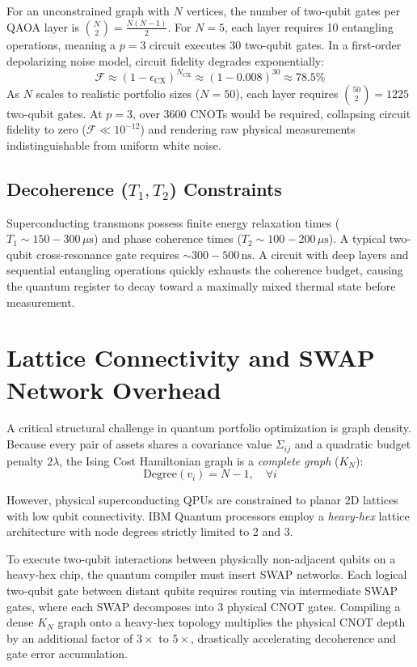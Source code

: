 For an unconstrained graph with $N$ vertices, the number of two-qubit gates per QAOA layer is $\binom{N}{2} = \frac{N(N-1)}{2}$. For $N = 5$, each layer requires 10 entangling operations, meaning a $p=3$ circuit executes 30 two-qubit gates. In a first-order depolarizing noise model, circuit fidelity degrades exponentially:
\begin{equation}
\mathcal{F} \approx (1 - \epsilon_{\text{CX}})^{N_{\text{CX}}} \approx (1 - 0.008)^{30} \approx 78.5\%
\end{equation}
As $N$ scales to realistic portfolio sizes ($N = 50$), each layer requires $\binom{50}{2} = 1225$ two-qubit gates. At $p=3$, over 3600 CNOTs would be required, collapsing circuit fidelity to zero ($\mathcal{F} \ll 10^{-12}$) and rendering raw physical measurements indistinguishable from uniform white noise.

\subsection{Decoherence \texorpdfstring{($T_1, T_2$)}{(T1, T2)} Constraints}
Superconducting transmons possess finite energy relaxation times ($T_1 \sim 150 - 300\,\mu\text{s}$) and phase coherence times ($T_2 \sim 100 - 200\,\mu\text{s}$). A typical two-qubit cross-resonance gate requires $\sim 300 - 500\,\text{ns}$. A circuit with deep layers and sequential entangling operations quickly exhausts the coherence budget, causing the quantum register to decay toward a maximally mixed thermal state before measurement.

\section{Lattice Connectivity and SWAP Network Overhead}
A critical structural challenge in quantum portfolio optimization is graph density. Because every pair of assets shares a covariance value $\Sigma_{ij}$ and a quadratic budget penalty $2\lambda$, the Ising Cost Hamiltonian graph is a \textit{complete graph} ($K_N$):
\begin{equation}
\text{Degree}(v_i) = N - 1, \quad \forall i
\end{equation}

However, physical superconducting QPUs are constrained to planar 2D lattices with low qubit connectivity. IBM Quantum processors employ a \textit{heavy-hex} lattice architecture with node degrees strictly limited to 2 and 3.

To execute two-qubit interactions between physically non-adjacent qubits on a heavy-hex chip, the quantum compiler must insert SWAP networks. Each logical two-qubit gate between distant qubits requires routing via intermediate SWAP gates, where each SWAP decomposes into 3 physical CNOT gates. Compiling a dense $K_N$ graph onto a heavy-hex topology multiplies the physical CNOT depth by an additional factor of $3\times$ to $5\times$, drastically accelerating decoherence and gate error accumulation.

